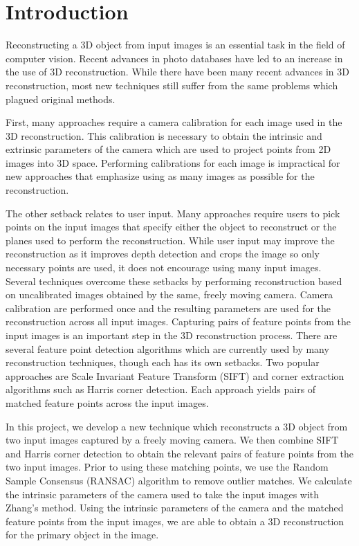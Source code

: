 \section{Introduction}
\label{s:intro}

Reconstructing a 3D object from input images is an essential task in the field of computer vision. Recent advances in photo databases have led to an increase in the use of 3D reconstruction. While there have been many recent advances in 3D reconstruction, most new techniques still suffer from the same problems which plagued original methods. 

First, many approaches require a camera calibration for each image used in the 3D reconstruction. This calibration is necessary to obtain the intrinsic and extrinsic parameters of the camera which are used to project points from 2D images into 3D space. Performing calibrations for each image is impractical for new approaches that emphasize using as many images as possible for the reconstruction.

The other setback relates to user input. Many approaches require users to pick points on the input images that specify either the object to reconstruct or the planes used to perform the reconstruction. While user input may improve the reconstruction as it improves depth detection and crops the image so only necessary points are used, it does not encourage using many input images. Several techniques overcome these setbacks by performing reconstruction based on uncalibrated images obtained by the same, freely moving camera. Camera calibration are performed once and the resulting parameters are used for the reconstruction across all input images. 
Capturing pairs of feature points from the input images is an important step in the 3D reconstruction process. There are several feature point detection algorithms which are currently used by many reconstruction techniques, though each has its own setbacks. Two popular approaches are Scale Invariant Feature Transform (SIFT) and corner extraction algorithms such as Harris corner detection. Each approach yields pairs of matched feature points across the input images. 

In this project, we develop a new technique which reconstructs a 3D object from two input images captured by a freely moving camera. We then combine SIFT and Harris corner detection to obtain the relevant pairs of feature points from the two input images. Prior to using these matching points, we use the Random Sample Consensus (RANSAC) algorithm to remove outlier matches. We calculate the intrinsic parameters of the camera used to take the input images with Zhang’s method. Using the intrinsic parameters of the camera and the matched feature points from the input images, we are able to obtain a 3D reconstruction for the primary object in the image.

